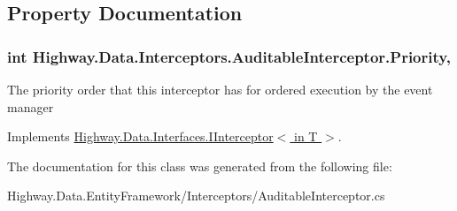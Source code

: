 \subsection{Property Documentation}
\hypertarget{class_highway_1_1_data_1_1_interceptors_1_1_auditable_interceptor_a58ec8c5deb639bea285d6d288a4838c3}{
\subsubsection[{Priority}]{\setlength{\rightskip}{0pt plus 5cm}int Highway.\-Data.\-Interceptors.\-Auditable\-Interceptor.\-Priority\hspace{0.3cm}{\ttfamily [get]}, {\ttfamily [set]}}}\label{class_highway_1_1_data_1_1_interceptors_1_1_auditable_interceptor_a58ec8c5deb639bea285d6d288a4838c3}


The priority order that this interceptor has for ordered execution by the event manager 



Implements \hyperlink{interface_highway_1_1_data_1_1_interfaces_1_1_i_interceptor-g_a7d04e39fcc9ecb1139044cbdda2df23a}{Highway.\-Data.\-Interfaces.\-I\-Interceptor$<$ in T $>$}.



The documentation for this class was generated from the following file\-:\begin{DoxyCompactItemize}
\item 
Highway.\-Data.\-Entity\-Framework/\-Interceptors/Auditable\-Interceptor.\-cs\end{DoxyCompactItemize}
